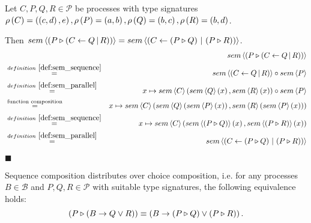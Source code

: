 \begin{myproof}
Let $C, P, Q, R \in \mathcal{P}$ be processes with type signatures $\rho \left( C \right) = \left( \left( c, d \right), e \right), \rho \left( P \right) = \left( a, b \right), \rho \left( Q \right) = \left( b, c \right), \rho \left( R \right) = \left( b, d \right)$.

Then $sem \left\langle \left( P \triangleright \left( C \gets Q \, | \, R \right) \right) \right\rangle = sem \left\langle \left( C \gets \left( P \triangleright Q \right) \, | \, \left( P \triangleright R \right) \right) \right\rangle$.
\begin{eqnarray*}
  & & \sem{\sequence{P}{\parallel{C}{Q}{R}}} \\
  & \overset{\defref{def:sem_sequence}}{=}   & \sem{\parallel{C}{Q}{R}} \circ \sem{P} \\
  & \overset{\defref{def:sem_parallel}}{=}   & x \mapsto \sem{C} \left( \sem{Q} \left( x \right), \sem{R} \left( x \right) \right) \circ \sem{P} \\
  & \overset{\text{function composition}}{=} & x \mapsto \sem{C} \left( \sem{Q} \left( \sem{P} \left( x \right) \right), \sem{R} \left( \sem{P} \left( x \right) \right) \right) \\
  & \overset{\defref{def:sem_sequence}}{=}   & x \mapsto \sem{C} \left( \sem{\sequence{P}{Q}} \left( x \right), \sem{\sequence{P}{R}} \left( x \right) \right) \\
  & \overset{\defref{def:sem_parallel}}{=}   & \sem{\parallel{C}{\sequence{P}{Q}}{\sequence{P}{R}}}
\end{eqnarray*}

\hfill$\blacksquare$
\end{myproof}


\begin{theorem}
\label{thm:distributivity_sequence_choice}
Sequence composition distributes over choice composition, i.e. for any processes $B \in \mathcal{B}$ and $P, Q, R \in \mathcal{P}$ with suitable type signatures, the following equivalence holds:
\begin{equation*}
  \left( P \triangleright \left( B \to Q \vee R \right) \right) \equiv \left( B \to \left( P \triangleright Q \right) \vee \left( P \triangleright R \right) \right).
\end{equation*}
\end{theorem}

